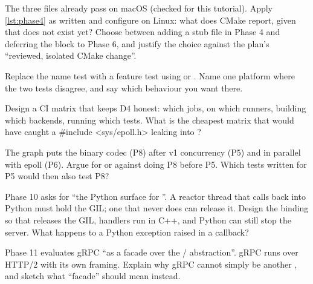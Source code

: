 \begin{exercises}
 The three  files already pass  on macOS
(checked for this tutorial). Apply \cref{lst:phase4} as written and configure on Linux: what does CMake report, given that
 does not exist yet? Choose between adding a stub file in Phase 4 and deferring the
 block to Phase 6, and justify the choice against the plan's ``reviewed, isolated CMake change''.

 Replace the name test  with a feature test using
 or . Name one platform where the two
tests disagree, and say which behaviour you want there.

 Design a CI matrix that keeps D4 honest: which jobs, on which runners, building which backends, running
which tests. What is the cheapest matrix that would have caught a {\ttfamily\color{org}\#include <sys/epoll.h>} leaking into ?

 The graph puts the binary codec (P8) after v1 concurrency (P5) and in parallel with epoll (P6).
Argue for or against doing P8 before P5. Which tests written for P5 would then also test P8?

 Phase 10 asks for ``the Python surface for ''. A reactor thread that calls back into
Python must hold the GIL; one that never does can release it. Design the binding so that  releases the
GIL, handlers run in C++, and Python can still stop the server. What happens to a Python exception raised in a callback?

 Phase 11 evaluates gRPC ``as a facade over the / abstraction''. gRPC runs
over HTTP/2 with its own framing. Explain why gRPC cannot simply be another , and sketch what ``facade''
should mean instead.
\end{exercises}
